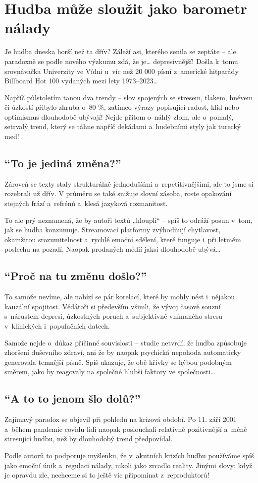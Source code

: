 \documentclass[main.tex]{subfiles}
\begin{document}
\section{Hudba může sloužit jako barometr nálady}
Je hudba dneska horší než ta dřív? Záleží asi, kterého senila se zeptáte – ale paradoxně se podle nového výzkumu zdá, že je… depresivnější! Došla k~tomu srovnávačka Univerzity ve Vídni u~víc než 20 000 písní z~americké hitparády Billboard Hot 100 vydaných mezi lety 1973–2023…\par
Napříč půlstoletím tanou dva trendy – slov spojených se stresem, tlakem, hněvem či úzkostí přibylo zhruba o~80 \%, zatímco výrazy popisující radost, klid nebo optimismus dlouhodobě ubývají! Nejde přitom o~náhlý zlom, ale o~pomalý, setrvalý trend, který se táhne napříč dekádami a~hudebními styly jak turecký med!
\subsection*{\enquote{To je jediná změna?}}
Zároveň se texty staly strukturálně jednoduššími a~repetitivnějšími, ale to jsme si rozebrali už dřív. V průměru se také snižuje slovní zásoba, roste opakování stejných frází a~refrénů a~klesá jazyková rozmanitost.\par
To ale prý neznamená, že by autoři textů „hloupli“ – spíš to odráží posun v~tom, jak se hudba konzumuje. Streamovací platformy zvýhodňují chytlavost, okamžitou srozumitelnost a~rychlé emoční sdělení, které funguje i~při letmém poslechu na pozadí. Naopak prodaných médií jaksi dlouhodobě ubývá…
\subsection*{\enquote{Proč na tu změnu došlo?}}
To samože nevíme, ale nabízí se pár korelací, které by mohly nést i~nějakou kauzální spojitost. Vědátoři si především všimli, že vývoj časově souzní s~nárůstem depresí, úzkostných poruch a~subjektivně vnímaného stresu v~klinických i~populačních datech.\par
Samože nejde o~důkaz příčinné souvislosti – studie netvrdí, že hudba způsobuje zhoršení duševního zdraví, ani že by naopak psychická nepohoda automaticky generovala temnější písně. Spíš ukazuje, že obě křivky se hýbou podobným směrem, jako by reagovaly na společné hlubší faktory ve společnosti…
\subsection*{\enquote{A to to jenom šlo dolů?}}
Zajímavý paradox se objevil při pohledu na krizová období. Po 11. září 2001 a~během pandemie covidu lidi naopak poslouchali relativně pozitivnější a~méně stresující hudbu, než by dlouhodobý trend předpovídal.\par
Podle autorů to podporuje myšlenku, že v~akutních krizích hudbu používáme spíš jako emoční únik a~regulaci nálady, nikoli jako zrcadlo reality. Jinými slovy: když je opravdu zle, nechceme si to ještě víc připomínat z~reproduktorů!
\end{document}
